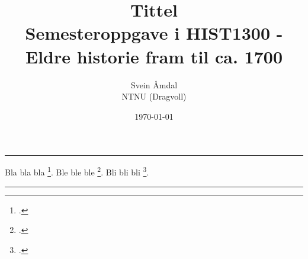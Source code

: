\documentclass[12pt, a4paper, norsk]{article}
\title{\huge{\textbf{Tittel}}\\ \large{Semesteroppgave i HIST1300 - Eldre historie fram til ca. 1700}}
\author{\huge{Svein Åmdal} \\ \large{NTNU (Dragvoll)}}
\date{\today} %
\begin{document}
\maketitle
\hrule
\vspace{1cm}
\setcounter{page}{1}

Bla bla bla \footcite[20]{Ødegård}. Ble ble ble \footcite[27--30]{Ødegård}. Bli bli bli \footcite[4,22-23,45]{Wiesner-Hanks,Pounds}.


% 

\lipsum[1-2]





\vspace{1cm}
\hrule
\printbibliography[title=Litteratur]
\end{document}
